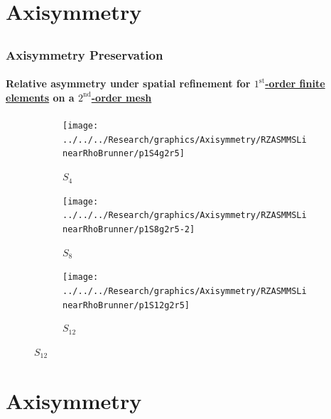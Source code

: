 \documentclass[compress,t]{beamer}
\begin{document}
\section{Axisymmetry}
\subsection{}

\begin{frame}
\frametitle{Axisymmetry Preservation}
\framesubtitle{Relative asymmetry under spatial refinement for \underline{$1^\text{st}$-order finite elements} on a \underline{$2^\text{nd}$-order mesh}}

\begin{figure}
\centering
\begin{subfigure}{0.33\textwidth}
\centering
\texttt{[image: ../../../Research/graphics/Axisymmetry/RZASMMSLinearRhoBrunner/p1S4g2r5]}
\caption{$S_4$}
\end{subfigure}%
\begin{subfigure}{0.33\textwidth}
\centering
\texttt{[image: ../../../Research/graphics/Axisymmetry/RZASMMSLinearRhoBrunner/p1S8g2r5-2]}
\caption{$S_8$}
\end{subfigure}%
\begin{subfigure}{0.33\textwidth}
\centering
\texttt{[image: ../../../Research/graphics/Axisymmetry/RZASMMSLinearRhoBrunner/p1S12g2r5]}
\caption{$S_{12}$}
\end{subfigure}
\end{figure}

\end{frame}

\section{Axisymmetry}
\subsection{}
\end{document}
